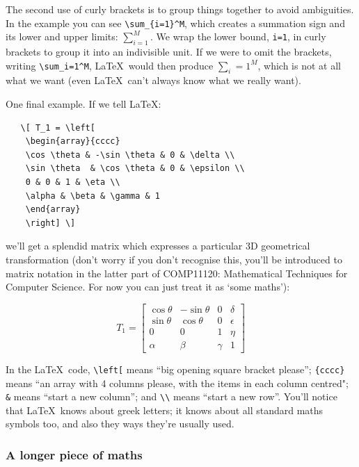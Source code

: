 \begin{refsection}
The second use of curly brackets is to group things together to avoid ambiguities. In the example you can see \verb|\sum_{i=1}^M|, which creates a summation sign and its lower and upper limits: \( \sum_{i=1}^{M} \). We wrap the lower bound, \verb|i=1|, in curly brackets to group it into an indivisible unit. If we were to omit the brackets, writing \verb|\sum_i=1^M|, \LaTeX\ would then produce \( \sum_i=1^M \), which is not at all what we want (even \LaTeX\ can't always know what we really want).

One final example. If we tell \LaTeX:

\begin{verbatim}
   \[ T_1 = \left[
    \begin{array}{cccc}
    \cos \theta & -\sin \theta & 0 & \delta \\
    \sin \theta  & \cos \theta & 0 & \epsilon \\
    0 & 0 & 1 & \eta \\
    \alpha & \beta & \gamma & 1
    \end{array}
    \right] \]
\end{verbatim}
%
we'll get a splendid matrix which expresses a particular 3D geometrical transformation (don't worry if you don't recognise this, you'll be introduced to matrix notation in the latter part of COMP11120: Mathematical Techniques for Computer Science. For now you can just treat it as `some maths'):

\[   T_1 = \left[
    \begin{array}{cccc}
    \cos \theta & -\sin \theta & 0 & \delta \\
    \sin \theta  & \cos \theta & 0 & \epsilon \\
    0 & 0 & 1 & \eta \\
    \alpha & \beta & \gamma & 1
    \end{array}
    \right]
\]
%

In the \LaTeX\ code,  \verb|\left[| means ``big opening square bracket please'';  \verb|{cccc}| means ``an array with 4 columns please, with the items in each column centred"; \verb|&| means ``start a new column''; and \verb|\\| means ``start a new row''. You'll notice that \LaTeX\ knows about  greek letters; it knows about all standard maths symbols too, and also they ways  they're usually used.


\subsubsection{A longer piece of maths}
\label{sec:longer-piece-maths}


\end{refsection}
